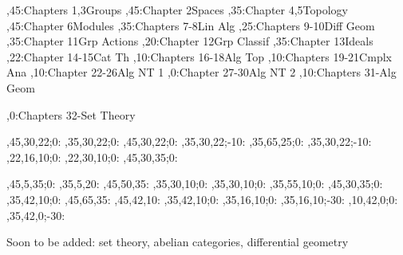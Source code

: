 
\setcounter{diagheight}{50}
\begin{chart}
,45:{Chapters 1,3}{Groups}{}
,45:{Chapter 2}{Spaces}{}
,35:{Chapter 4,5}{Topology}{}
,45:{Chapter 6}{Modules}{}
,35:{Chapters 7-8}{Lin Alg}{}
,25:{Chapters 9-10}{Diff Geom}{}
,35:{Chapter 11}{Grp Actions}{}
,20:{Chapter 12}{Grp Classif}{}
,35:{Chapter 13}{Ideals}{}
,22:{Chapter 14-15}{Cat Th}{}
,10:{Chapters 16-18}{Alg Top}{}
,10:{Chapters 19-21}{Cmplx Ana}{}
,10:{Chapter 22-26}{Alg NT 1}{}
,0:{Chapter 27-30}{Alg NT 2}{}
,10:{Chapters 31-}{Alg Geom}{}

,0:{Chapters 32-}{Set Theory}{}

,45,30,22;0:   %
,35,30,22;0:   %
,45,30,22;0:   %
,35,30,22;-10: %
,35,65,25;0:   %
,35,30,22;-10: %
,22,16,10;0:   %
,22,30,10;0:   %
,45,30,35;0:   %

,45,5,35;0:    %
,35,5,20:      %
,45,50,35:     %
,35,30,10;0:   %
,35,30,10;0:   %
,35,55,10;0:   %
,45,30,35;0:   %
,35,42,10;0:   %
,45,65,35:     %
,45,42,10:     %
,35,42,10;0:   %
,35,16,10;0:   %
,35,16,10;-30: %
,10,42,0;0:    %
,35,42,0;-30:  %
\end{chart}

Soon to be added: set theory, abelian categories, differential geometry
